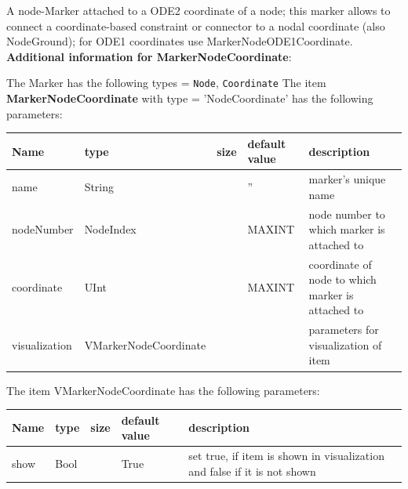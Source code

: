 \label{sec:item:MarkerNodeCoordinate}
A node-Marker attached to a ODE2 coordinate of a node; this marker allows to connect a coordinate-based constraint or connector to a nodal coordinate (also NodeGround); for ODE1 coordinates use MarkerNodeODE1Coordinate.\vspace{12pt}
 \\{\bf Additional information for MarkerNodeCoordinate}:
\bi
  \item The Marker has the following types = \texttt{Node}, \texttt{Coordinate}
\ei
\vspace{12pt} \noindent The item {\bf MarkerNodeCoordinate} with type = 'NodeCoordinate' has the following parameters:\vspace{-1cm}\\ 
\begin{center}
  \footnotesize
  \begin{longtable}{| p{4.5cm} | p{2.5cm} | p{0.5cm} | p{2.5cm} | p{6cm} |}
    \hline
    \bf Name & \bf type & \bf size & \bf default value & \bf description \\ \hline
    name &     String &      &     '' &     marker's unique name\\ \hline
    nodeNumber &     NodeIndex &      &     MAXINT &     node number to which marker is attached to\\ \hline
    coordinate &     UInt &      &     MAXINT &     coordinate of node to which marker is attached to\\ \hline
    visualization & VMarkerNodeCoordinate & & & parameters for visualization of item \\ \hline
	  \end{longtable}
	\end{center}
The item VMarkerNodeCoordinate has the following parameters:\vspace{-1cm}\\ 
\begin{center}
  \footnotesize
  \begin{longtable}{| p{4.5cm} | p{2.5cm} | p{0.5cm} | p{2.5cm} | p{6cm} |}
    \hline
    \bf Name & \bf type & \bf size & \bf default value & \bf description \\ \hline
    show &     Bool &      &     True &     set true, if item is shown in visualization and false if it is not shown\\ \hline
	  \end{longtable}
	\end{center}
